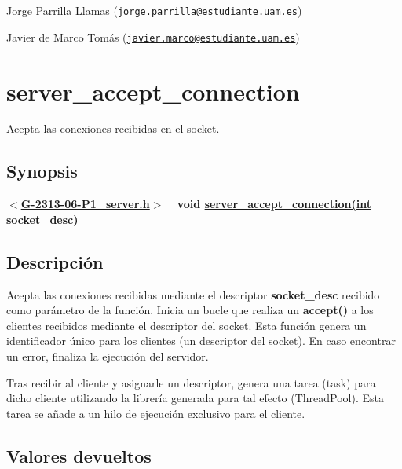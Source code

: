 \begin{DoxyItemize}
\item Jorge Parrilla Llamas (\href{mailto:jorge.parrilla@estudiante.uam.es}{\tt jorge.\+parrilla@estudiante.\+uam.\+es}) 
\item Javier de Marco Tomás (\href{mailto:javier.marco@estudiante.uam.es}{\tt javier.\+marco@estudiante.\+uam.\+es}) 
\end{DoxyItemize}\hypertarget{server_accept_connection}{}\section{server\+\_\+accept\+\_\+connection}\label{server_accept_connection}
Acepta las conexiones recibidas en el socket.\hypertarget{server_accept_connection_synopsis3}{}\subsection{Synopsis}\label{server_accept_connection_synopsis3}
{ {\bfseries $<$\hyperlink{G-2313-06-P1__server_8h}{G-\/2313-\/06-\/\+P1\+\_\+server.\+h}$>$} ~\newline
 {\bfseries void \hyperlink{G-2313-06-P1__server_8c_aaac8642d2e699e0f9d942d28a9b233c2}{server\+\_\+accept\+\_\+connection(int socket\+\_\+desc)}} } \hypertarget{server_accept_connection_descripcion3}{}\subsection{Descripción}\label{server_accept_connection_descripcion3}
Acepta las conexiones recibidas mediante el descriptor {\bfseries socket\+\_\+desc} recibido como parámetro de la función. Inicia un bucle que realiza un {\bfseries accept()} a los clientes recibidos mediante el descriptor del socket. Esta función genera un identificador único para los clientes (un descriptor del socket). En caso encontrar un error, finaliza la ejecución del servidor. 

Tras recibir al cliente y asignarle un descriptor, genera una tarea (task) para dicho cliente utilizando la librería generada para tal efecto (Thread\+Pool). Esta tarea se añade a un hilo de ejecución exclusivo para el cliente.\hypertarget{server_accept_connection_return3}{}\subsection{Valores devueltos}\label{server_accept_connection_return3}

